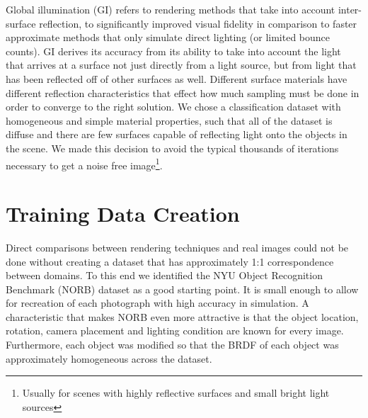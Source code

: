 \documentclass[10pt,twocolumn,letterpaper]{article}
\begin{document}
Global illumination (GI) refers to rendering methods that take into account inter-surface reflection, to significantly improved visual fidelity in comparison to faster approximate methods that only simulate direct lighting (or limited bounce counts).  GI derives its accuracy from its ability to take into account the light that arrives at a surface not just directly from a light source, but from light that has been reflected off of other surfaces as well. Different surface materials have different reflection characteristics that effect how much sampling must be done in order to converge to the right solution. We chose a classification dataset with homogeneous and simple material properties, such that all of the dataset is diffuse and there are few surfaces capable of reflecting light onto the objects in the scene. We made this decision to avoid the typical thousands of iterations necessary to get a noise free image\footnote{Usually for scenes with highly reflective surfaces and small bright light sources}.


\section{Training Data Creation}\label{TrainingData}
Direct comparisons between rendering techniques and real images could not be done without creating a dataset that has approximately 1:1 correspondence between domains.  To this end we identified the NYU Object Recognition Benchmark (NORB) dataset \cite{LeCun:2004:LMG:1896300.1896315} as a good starting point. It is small enough to allow for recreation of each photograph with high accuracy in simulation.  A characteristic that makes NORB even more attractive is that the object location, rotation, camera placement and lighting condition are known for every image. Furthermore, each object was modified so that the BRDF of each object was approximately homogeneous across the dataset.
\end{document}
